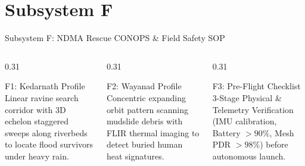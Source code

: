 \documentclass[aspectratio=169, 10pt]{beamer}
\begin{document}
\section{Subsystem F}
\begin{frame}{Subsystem F: NDMA Rescue CONOPS \& Field Safety SOP}
  \begin{columns}[T]
    \begin{column}{0.31\textwidth}
      \begin{defensecard}{F1: Kedarnath Profile}
        {\tiny
          Linear ravine search corridor with 3D echelon staggered sweeps along riverbeds to locate flood survivors under heavy rain.
        }
      \end{defensecard}
    \end{column}

    \begin{column}{0.31\textwidth}
      \begin{defensecard}{F2: Wayanad Profile}
        {\tiny
          Concentric expanding orbit pattern scanning mudslide debris with FLIR thermal imaging to detect buried human heat signatures.
        }
      \end{defensecard}
    \end{column}

    \begin{column}{0.31\textwidth}
      \begin{highlightcard}{F3: Pre-Flight Checklist}
        {\tiny
          3-Stage Physical \& Telemetry Verification (IMU calibration, Battery $> 90\%$, Mesh PDR $> 98\%$) before autonomous launch.
        }
      \end{highlightcard}
    \end{column}
  \end{columns}
\end{frame}

\end{document}
